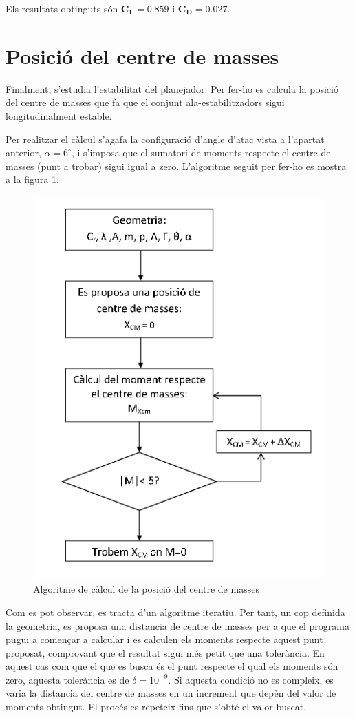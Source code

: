 Els resultats obtinguts són $\bm{C_{L} = 0.859} $ i $\bm{C_{D} = 0.027} $.


\section{Posició del centre de masses}

Finalment, s'estudia l'estabilitat del planejador. Per fer-ho es calcula la posició del centre de masses que fa que el conjunt ala-estabilitzadors sigui longitudinalment estable. 

Per realitzar el càlcul s'agafa la configuració d'angle d'atac vista a l'apartat anterior, $\alpha=6^{\circ}$, i s'imposa que el sumatori de moments respecte el centre de masses (punt a trobar) sigui igual a zero. L'algoritme seguit per fer-ho es mostra a la figura \ref{AlgoritmeCM}.

\begin{figure}[H]
	\centering
	\includegraphics[scale=0.5]{./plots/algoritmeCM}
	\caption{Algoritme de càlcul de la posició del centre de masses}
	\label{AlgoritmeCM}
\end{figure}

Com es pot observar, es tracta d'un algoritme iteratiu. Per tant, un cop definida la geometria, es proposa una distancia de centre de masses per a que el programa pugui a començar a calcular i es calculen els moments respecte aquest punt proposat, comprovant que el resultat sigui més petit que una tolerància. En aquest cas com que el que es busca és el punt respecte el qual els moments són zero, aquesta tolerància es de $\delta=10^{-9}$. Si aquesta condició no es compleix, es varia la distancia del centre de masses en un increment que depèn del valor de moments obtingut. El procés es repeteix fins que s'obté el valor buscat. 

